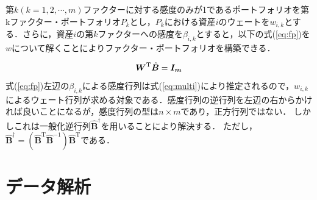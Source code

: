 ﻿\documentclass[11pt]{jreport}
\begin{document}
第$k(k=1,2,\cdots,m)$ファクターに対する感度のみが1であるポートフォリオを第kファクター・ポートフォリオ$P_k$とし，$P_k$における資産$i$のウェートを$w_{i,k}$とする．さらに，資産$i$の第$k$ファクターへの感度を$\beta_{i,k}$とすると，以下の式(\ref{eq:fp})を\mbox{\boldmath $w$}について解くことによりファクター・ポートフォリオを構築できる．



\begin{equation}
\mbox{\boldmath $W$}^\text{T} \hat{\bm{B}} = \mbox{\boldmath $I_m$}
\label{eq:fp}
\end{equation}
式(\ref{eq:fp})左辺の$\beta_{i,k}$による感度行列は式(\ref{eq:multi})により推定されるので，$w_{i,k}$によるウェート行列が求める対象である．感度行列の逆行列を左辺の右からかければ良いことになるが，感度行列の型は$n\times m$であり，正方行列ではない．
しかしこれは一般化逆行列$\hat{\bm{B}}^\dag$を用いることにより解決する．
ただし，$\hat{\bm{B}}^\dag = (\hat{\bm{B}}^\text{T}\hat{\bm{B}}^{-1})\hat{\bm{B}}^\text{T}$である．







\chapter{データ解析}
\end{document}
